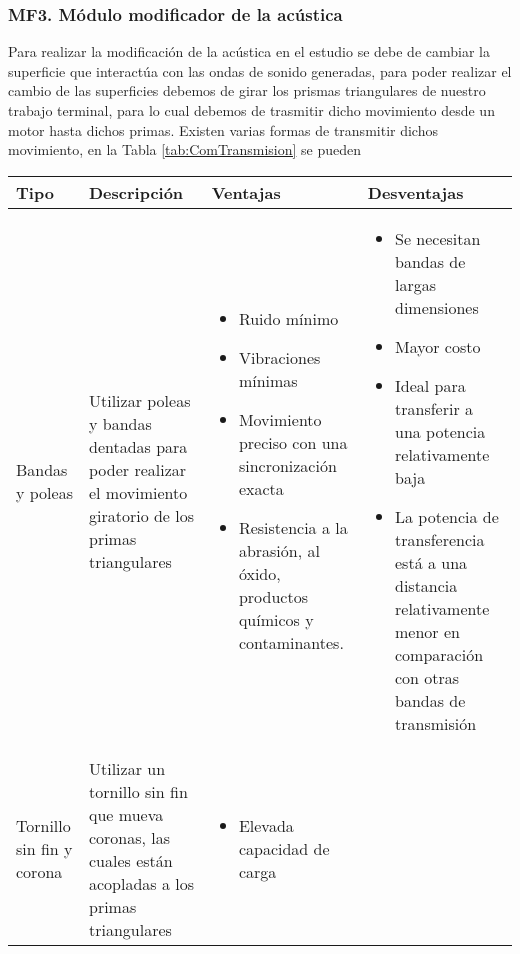 \subsubsection{MF3. Módulo modificador de la acústica}
Para realizar la modificación de la acústica en el estudio se debe de cambiar la superficie que interactúa con las ondas de sonido generadas, para poder realizar el cambio de las superficies debemos de girar los prismas triangulares de nuestro trabajo terminal, para lo cual debemos de trasmitir dicho movimiento desde un motor hasta dichos primas. Existen varias formas de transmitir dichos movimiento, en la Tabla \ref{tab:ComTransmision} se pueden 
\begin{center}
\footnotesize
    \begin{longtable}[!htb]{| m{5em} | m{12em} | m{12em}| m{12em}|}
    \hline
    \textbf{Tipo}& \textbf{Descripción} & \textbf{Ventajas} & \textbf{Desventajas}\\
    \hline\hline
    Bandas y poleas& Utilizar poleas y bandas dentadas para poder realizar el movimiento giratorio de los primas triangulares &
    \begin{itemize}
        \item Ruido mínimo
        \item Vibraciones mínimas
        \item Movimiento preciso con una sincronización exacta
        \item Resistencia a la abrasión, al óxido, productos químicos y contaminantes.
    \end{itemize}
    & 
    \begin{itemize}
        \item Se necesitan bandas de largas dimensiones
        \item Mayor costo
        \item Ideal para transferir a una potencia relativamente baja
        \item La potencia de transferencia está a una distancia relativamente menor en comparación con otras bandas de transmisión
    \end{itemize}\\
    \hline
    Tornillo sin fin y corona & Utilizar un tornillo sin fin que mueva coronas, las cuales están acopladas a los primas triangulares &
    \begin{itemize}
        \item Elevada capacidad de carga

\end{itemize}
\end{longtable}
\end{center}
